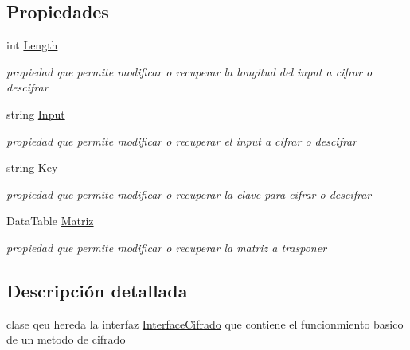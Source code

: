 \subsection*{Propiedades}
\begin{DoxyCompactItemize}
\item 
int \hyperlink{class_cifrado_1_1_transposicion_a732e580b22860879283fd70933821194}{Length}
\begin{DoxyCompactList}\small\item\em propiedad que permite modificar o recuperar la longitud del input a cifrar o descifrar \end{DoxyCompactList}\item 
string \hyperlink{class_cifrado_1_1_transposicion_ae35952dd0b3f5c626fa4f7c084428f8a}{Input}
\begin{DoxyCompactList}\small\item\em propiedad que permite modificar o recuperar el input a cifrar o descifrar \end{DoxyCompactList}\item 
string \hyperlink{class_cifrado_1_1_transposicion_ada94313eb5cb29e6c95ade7bd2f8306f}{Key}
\begin{DoxyCompactList}\small\item\em propiedad que permite modificar o recuperar la clave para cifrar o descifrar \end{DoxyCompactList}\item 
Data\+Table \hyperlink{class_cifrado_1_1_transposicion_a0befab6514e913da972697a59f27b14a}{Matriz}
\begin{DoxyCompactList}\small\item\em propiedad que permite modificar o recuperar la matriz a trasponer \end{DoxyCompactList}\end{DoxyCompactItemize}


\subsection{Descripción detallada}
clase qeu hereda la interfaz \hyperlink{interface_cifrado_1_1_interface_cifrado}{Interface\+Cifrado} que contiene el funcionmiento basico de un metodo de cifrado 



